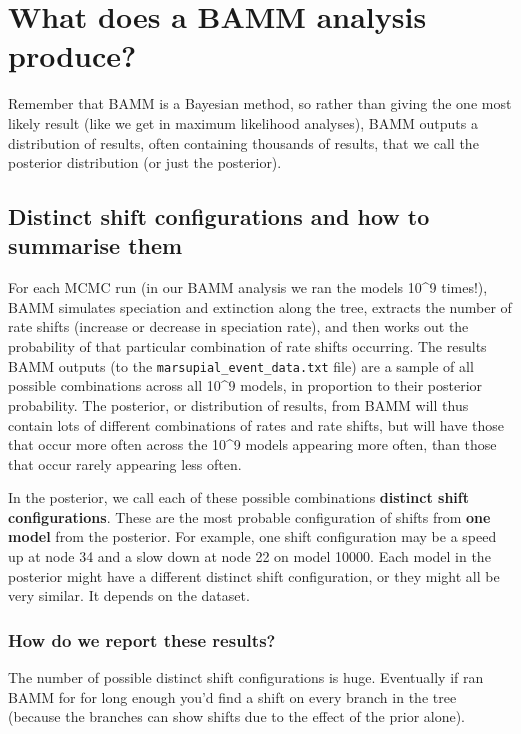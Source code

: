 \documentclass[]{book}
\begin{document}
\section{What does a BAMM analysis
produce?}\label{what-does-a-bamm-analysis-produce}

Remember that BAMM is a Bayesian method, so rather than giving the one
most likely result (like we get in maximum likelihood analyses), BAMM
outputs a distribution of results, often containing thousands of
results, that we call the posterior distribution (or just the
posterior).

\subsection{Distinct shift configurations and how to summarise
them}\label{distinct-shift-configurations-and-how-to-summarise-them}

For each MCMC run (in our BAMM analysis we ran the models 10\^{}9
times!), BAMM simulates speciation and extinction along the tree,
extracts the number of rate shifts (increase or decrease in speciation
rate), and then works out the probability of that particular combination
of rate shifts occurring. The results BAMM outputs (to the
\texttt{marsupial\_event\_data.txt} file) are a sample of all possible
combinations across all 10\^{}9 models, in proportion to their posterior
probability. The posterior, or distribution of results, from BAMM will
thus contain lots of different combinations of rates and rate shifts,
but will have those that occur more often across the 10\^{}9 models
appearing more often, than those that occur rarely appearing less often.

In the posterior, we call each of these possible combinations
\textbf{distinct shift configurations}. These are the most probable
configuration of shifts from \textbf{one model} from the posterior. For
example, one shift configuration may be a speed up at node 34 and a slow
down at node 22 on model 10000. Each model in the posterior might have a
different distinct shift configuration, or they might all be very
similar. It depends on the dataset.

\subsubsection{How do we report these
results?}\label{how-do-we-report-these-results}

The number of possible distinct shift configurations is huge. Eventually
if ran BAMM for for long enough you'd find a shift on every branch in
the tree (because the branches can show shifts due to the effect of the
prior alone).
\end{document}
